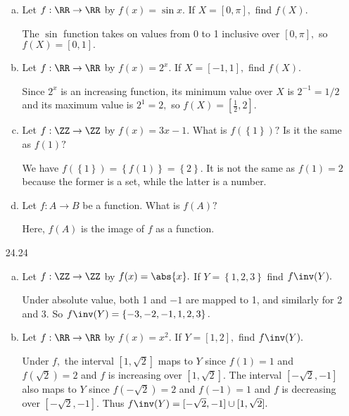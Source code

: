 \documentclass{article}
\begin{document}
\begin{itemize}
\begin{enumerate}[(a)]
			\item Let $f:\RR\to\RR$ by $f(x)=\sin x.$ If $X=[0, \pi],$ find $f(X).$
				\begin{answer*}
					The $\sin$ function takes on values from 0 to 1 inclusive over $[0, \pi],$ so $f(X)=[0, 1].$
				\end{answer*}

			\item Let $f:\RR\to \RR$ by $f(x)=2^x.$ If $X=[-1, 1],$ find $f(X).$
				\begin{answer*}
					Since $2^x$ is an increasing function, its minimum value over $X$ is $2^{-1}=1/2$ and its maximum value is $2^1=2,$ so $f(X)=\left[ \frac{1}{2}, 2 \right].$
				\end{answer*}

			\item Let $f:\ZZ\to\ZZ$ by $f(x)=3x-1.$ What is $f(\left\{ 1 \right\})?$ Is it the same as $f(1)?$
				\begin{answer*}
					We have $f(\left\{ 1 \right\}) = \left\{ f(1) \right\} = \left\{ 2 \right\}.$ It is not the same as $f(1)=2$ because the former is a set, while the latter is a number.
				\end{answer*}

			\item Let $f:A\to B$ be a function. What is $f(A)?$
				\begin{answer*}
					Here, $f(A)$ is the image of $f$ as a function.
				\end{answer*}
				
		\end{enumerate}

	\item[24.24]
		\begin{enumerate}[(a)]
			\item Let $f:\ZZ\to\ZZ$ by $f(x)=\abs{x}.$ If $Y=\left\{ 1, 2, 3 \right\}$ find $f\inv(Y).$
				\begin{answer*}
					Under absolute value, both 1 and $-1$ are mapped to 1, and similarly for 2 and 3. So $f\inv(Y)=\left\{ -3, -2, -1, 1, 2, 3 \right\}.$
				\end{answer*}

			\item Let $f:\RR\to\RR$ by $f(x)=x^2.$ If $Y=[1, 2],$ find $f\inv(Y).$
				\begin{answer*}
					Under $f,$ the interval $[1, \sqrt{2}]$ maps to $Y$ since $f(1)=1$ and $f(\sqrt{2})=2$ and $f$ is increasing over $[1, \sqrt{2}].$ The interval $[-\sqrt{2}, -1]$ also maps to $Y$ since $f(-\sqrt{2})=2$ and $f(-1)=1$ and $f$ is decreasing over $[-\sqrt{2}, -1].$ Thus $f\inv(Y)=[-\sqrt{2}, -1]\cup [1, \sqrt{2}].$
				\end{answer*}


\end{enumerate}
\end{itemize}
\end{document}
